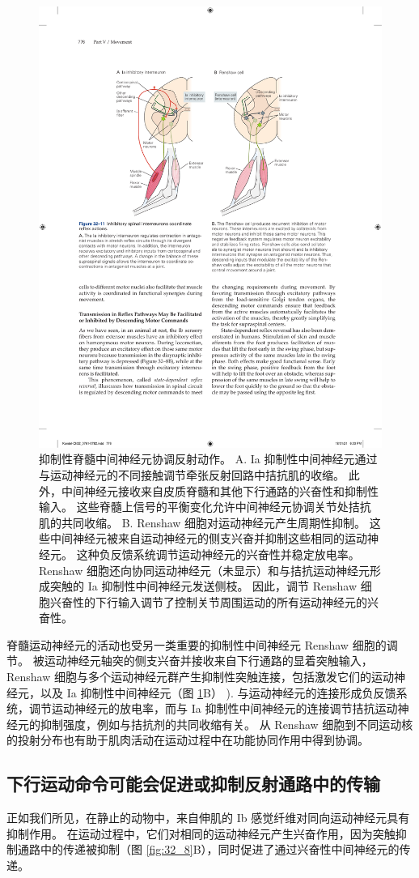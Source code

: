 \begin{figure}[htbp]
	\centering
	\includegraphics[width=0.75\linewidth]{chap32/fig_32_11}
	\caption{抑制性脊髓中间神经元协调反射动作。 A. Ia 抑制性中间神经元通过与运动神经元的不同接触调节牵张反射回路中拮抗肌的收缩。 此外，中间神经元接收来自皮质脊髓和其他下行通路的兴奋性和抑制性输入。 这些脊髓上信号的平衡变化允许中间神经元协调关节处拮抗肌的共同收缩。 B. Renshaw 细胞对运动神经元产生周期性抑制。 这些中间神经元被来自运动神经元的侧支兴奋并抑制这些相同的运动神经元。 这种负反馈系统调节运动神经元的兴奋性并稳定放电率。 Renshaw 细胞还向协同运动神经元（未显示）和与拮抗运动神经元形成突触的 Ia 抑制性中间神经元发送侧枝。 因此，调节 Renshaw 细胞兴奋性的下行输入调节了控制关节周围运动的所有运动神经元的兴奋性。}
	\label{fig:32_11}
\end{figure}

脊髓运动神经元的活动也受另一类重要的抑制性中间神经元 Renshaw 细胞的调节。 被运动神经元轴突的侧支兴奋并接收来自下行通路的显着突触输入，Renshaw 细胞与多个运动神经元群产生抑制性突触连接，包括激发它们的运动神经元，以及 Ia 抑制性中间神经元（图 \ref{fig:32_11}B） ). 与运动神经元的连接形成负反馈系统，调节运动神经元的放电率，而与 Ia 抑制性中间神经元的连接调节拮抗运动神经元的抑制强度，例如与拮抗剂的共同收缩有关。 从 Renshaw 细胞到不同运动核的投射分布也有助于肌肉活动在运动过程中在功能协同作用中得到协调。


\subsection{下行运动命令可能会促进或抑制反射通路中的传输}
正如我们所见，在静止的动物中，来自伸肌的 Ib 感觉纤维对同向运动神经元具有抑制作用。 在运动过程中，它们对相同的运动神经元产生兴奋作用，因为突触抑制通路中的传递被抑制（图 \ref{fig:32_8}B），同时促进了通过兴奋性中间神经元的传递。

